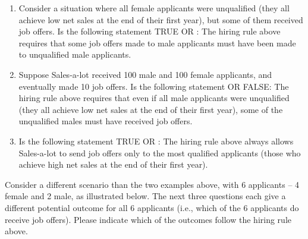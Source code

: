 \documentclass{article}
\newcommand{\correct}[1]{{\color{red}{#1}}}
\newcommand{\correct}[1]{{\color{red}{#1}}}
\begin{document}
\begin{enumerate}
\item Consider a situation where all female applicants were unqualified (they all achieve low net sales at the end of their first year), but some of them received job offers. Is the following statement TRUE OR \correct{FALSE}: The hiring rule above requires that some job offers made to male applicants must have been made to unqualified male applicants.

\item Suppose Sales-a-lot received 100 male and 100 female applicants, and eventually made 10 job offers. Is the following statement \correct{TRUE} OR FALSE: The hiring rule above requires that even if all male applicants were unqualified (they all achieve low net sales at the end of their first year), some of the unqualified males must have received job offers.

\item Is the following statement TRUE OR \correct{FALSE}: The hiring rule above always allows Sales-a-lot to send job offers only to the most qualified applicants (those who achieve high net sales at the end of their first year).

\end{enumerate}

Consider a different scenario than the two examples above, with 6 applicants -- 4 female and 2 male, as illustrated below. The next three questions each give a different potential outcome for all 6 applicants (i.e., which of the 6 applicants do receive job offers). Please indicate which of the outcomes follow the hiring rule above.
\end{document}
